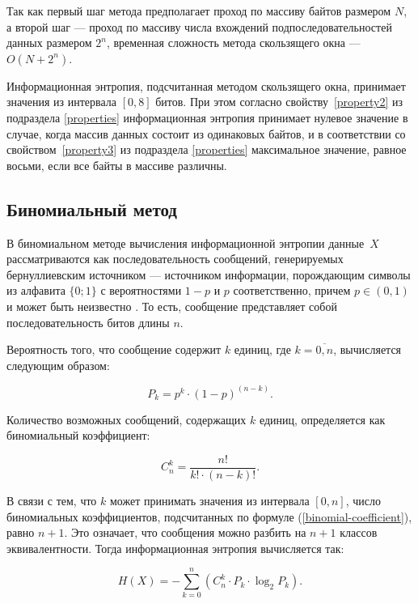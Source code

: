Так как первый шаг метода предполагает проход по массиву байтов размером $N$, а второй шаг --- проход по массиву числа вхождений подпоследовательностей данных размером $2^n$, временная сложность метода скользящего окна --- $O(N + 2^n)$. 

Информационная энтропия, подсчитанная методом скользящего окна, принимает значения из интервала $[0, 8]$ битов. При этом согласно свойству~\ref{property2} из подраздела \ref{properties} информационная энтропия принимает нулевое значение в случае, когда массив данных состоит из одинаковых байтов, и в соответствии со свойством~\ref{property3} из подраздела \ref{properties} максимальное значение, равное восьми, если все байты в массиве различны.

\subsection{Биномиальный метод}

В биномиальном методе вычисления информационной энтропии \cite{binomial-method} данные~$X$ рассматриваются как последовательность сообщений, генерируемых бернуллиевским источником --- источником информации, порождающим символы из алфавита $\{0; 1\}$ с вероятностями $1 - p$ и $p$ соответственно, причем $p \in (0, 1)$ и может быть неизвестно \cite{bernullie-source}. То есть, сообщение представляет собой последовательность битов длины $n$.

Вероятность того, что сообщение содержит $k$ единиц, где $k = \overline{0, n}$, вычисляется следующим образом:

\begin{equation}\label{pk}
	P_{k} = p^k \cdot (1 - p)^{(n - k)}.
\end{equation} 

Количество возможных сообщений, содержащих $k$ единиц, определяется как биномиальный коэффициент:

\begin{equation}\label{binomial-coefficient}
	C_{n}^k = \frac{n!}{k! \cdot (n - k)!}.
\end{equation}

В связи с тем, что $k$ может принимать значения из интервала $[0, n]$, число биномиальных коэффициентов, подсчитанных по формуле (\ref{binomial-coefficient}), равно $n + 1$. Это означает, что сообщения можно разбить на $n + 1$ классов эквивалентности. Тогда информационная энтропия вычисляется так:

\begin{equation}\label{binomial-entropy}
	H(X) = -\sum_{k = 0}^n (C_{n}^k \cdot P_{k} \cdot \log_{2}P_{k}).
\end{equation}


